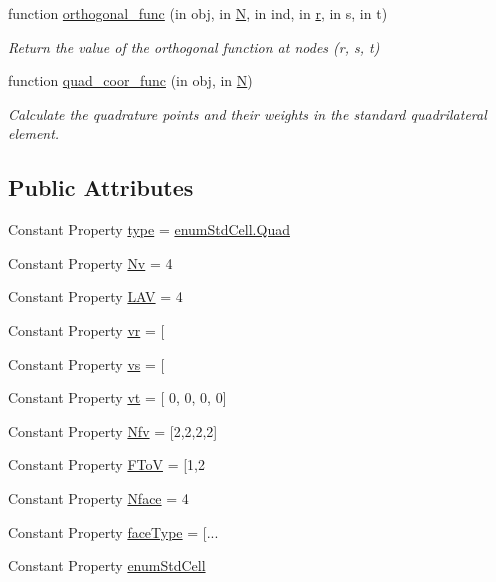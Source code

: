 \begin{DoxyCompactItemize}
function \hyperlink{class_std_quad_af78d77efda60c5a4b44e6268cb1c7fed}{orthogonal\+\_\+func} (in obj, in \hyperlink{class_std_cell_a8df35ad5169af36d3dff62644f7878c9}{N}, in ind, in \hyperlink{class_std_cell_a737dd2feb25f74be0215a594334ec622}{r}, in s, in t)
\begin{DoxyCompactList}\small\item\em Return the value of the orthogonal function at nodes (r, s, t) \end{DoxyCompactList}\item 
function \hyperlink{class_std_quad_af1777fb67ad210f38d68c4c716634917}{quad\+\_\+coor\+\_\+func} (in obj, in \hyperlink{class_std_cell_a8df35ad5169af36d3dff62644f7878c9}{N})
\begin{DoxyCompactList}\small\item\em Calculate the quadrature points and their weights in the standard quadrilateral element. \end{DoxyCompactList}\end{DoxyCompactItemize}
\subsection*{Public Attributes}
\begin{DoxyCompactItemize}
\item 
Constant Property \hyperlink{class_std_quad_a2a2014293743216446f22fd800b36b2c}{type} = \hyperlink{classenum_std_cell_ac4c2fa4e189e76e103f3ff9b1d19b9e7a79d1c44e78bdfebfd755a724f5e04029}{enum\+Std\+Cell.\+Quad}
\item 
Constant Property \hyperlink{class_std_quad_a92b472d27841677ab402588a926c5694}{Nv} = 4
\item 
Constant Property \hyperlink{class_std_quad_ae9411c2902e97e22480f64470375762c}{L\+AV} = 4
\item 
Constant Property \hyperlink{class_std_quad_a0888f306ffa8147e632292b4e7547404}{vr} = \mbox{[}
\item 
Constant Property \hyperlink{class_std_quad_ae785166c7821862cffa780480e1e00e9}{vs} = \mbox{[}
\item 
Constant Property \hyperlink{class_std_quad_ae1a39038e05ac243fa152fd0da69446a}{vt} = \mbox{[} 0, 0, 0, 0\mbox{]}\textquotesingle{}
\item 
Constant Property \hyperlink{class_std_quad_a230170b25ccb3ee32022d11cb01df64f}{Nfv} = \mbox{[}2,2,2,2\mbox{]}\textquotesingle{}
\item 
Constant Property \hyperlink{class_std_quad_a63931a17b5dac1dbf5cf0d82978d6465}{F\+ToV} = \mbox{[}1,2
\item 
Constant Property \hyperlink{class_std_quad_a1fc1318a46ac3d74802d12fa3c1dcae4}{Nface} = 4
\item 
Constant Property \hyperlink{class_std_quad_ae9b700feb4ae0f1a76b14ae20c11a5e6}{face\+Type} = \mbox{[}...
\item 
Constant Property \hyperlink{class_std_quad_aee5c77166740fe41c19a54db969d8f80}{enum\+Std\+Cell}
\end{DoxyCompactItemize}
